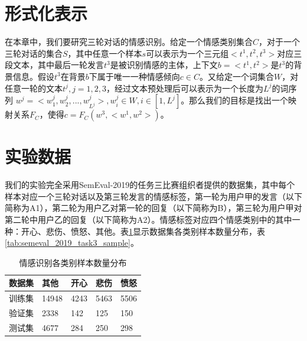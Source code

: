\section{形式化表示}
\label{sec:exp_context_emo_format}

在本章中，我们要研究三轮对话的情感识别。给定一个情感类别集合$C$，对于一个三轮对话的集合$S$，其中任意一个样本$s$可以表示为一个三元组$<t^1, t^2, t^3>$对应三段文本，其中最后一轮发言$t^3$是被识别情感的主体，上下文$b=<t^1, t^2>$是$t^3$的背景信息。假设$t^3$在背景$b$下属于唯一一种情感倾向$c \in C$。又给定一个词集合$W$，对任意一轮的文本$t^j, j=1,2,3$，经过文本预处理后可以表示为一个长度为$L^j$的词序列 $w^j = <w^j_1, w^j_2, ..., w^j_{L^j}>, w^j_i \in W, i \in [1, L^j]$。那么我们的目标是找出一个映射关系$F_C$，使得$c=F_C(w^3, <w^1, w^2>)$。

\section{实验数据}
\label{sec:exp_context_emo_data}

我们的实验完全采用SemEval-2019的任务三比赛组织者提供的数据集，其中每个样本对应一个三轮对话以及第三轮发言的情感标签，第一轮为用户甲的发言（以下简称为A1），第二轮为用户乙对第一轮的回复（以下简称为B），第三轮为用户甲对第二轮中用户乙的回复（以下简称为A2）。情感标签对应四个情感类别中的其中一种：开心、悲伤、愤怒、其他。表\ref{tab:semeval_2019_task3_data}显示数据集各类别样本数量分布，表\ref{tab:semeval_2019_task3_sample}。

\begin{table}[htb]
  \centering
  \begin{minipage}[t]{0.8\linewidth}
  \caption{情感识别各类别样本数量分布}
  \label{tab:semeval_2019_task3_data}
    \begin{tabularx}{\linewidth}{X|XXXX}
    \toprule[1.5pt]
    数据集 & 其他 & 开心 & 悲伤 & 愤怒 \\  
    \hline
    训练集 & 14948 & 4243 & 5463 & 5506 \\
    验证集 & 2338 & 142 & 125 & 150 \\
    测试集 & 4677 & 284 & 250 & 298 \\
    \bottomrule[1.5pt]
    \end{tabularx}
  \end{minipage}
\end{table}


